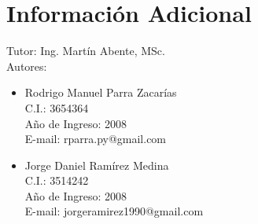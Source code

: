 \section*{Informaci\'{o}n Adicional}
\label{sec:info}

Tutor: Ing. Martín Abente, MSc.\\

Autores:
\begin{itemize}[leftmargin=2cm]
    \item Rodrigo Manuel Parra Zacar\'{i}as\\
    C.I.: 3654364\\
    A\~{n}o de Ingreso: 2008\\
    E-mail: rparra.py@gmail.com

    \item Jorge Daniel Ram\'{i}rez Medina\\
    C.I.: 3514242\\
    A\~{n}o de Ingreso: 2008\\
    E-mail: jorgeramirez1990@gmail.com
\end{itemize}
